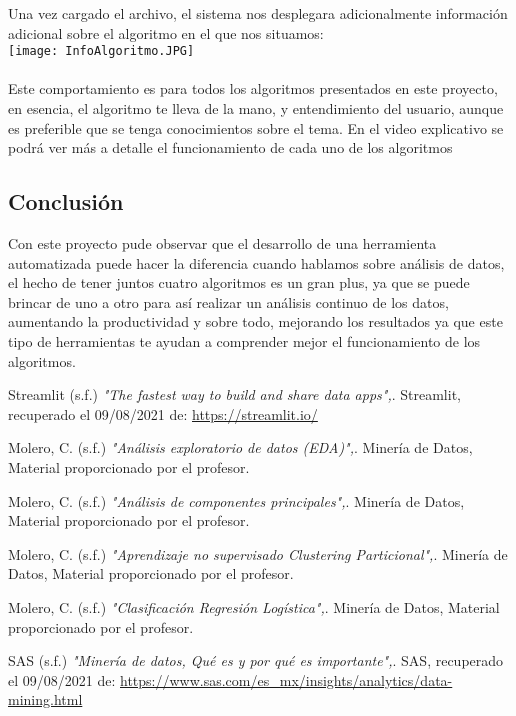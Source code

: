 \documentclass[10pt,a4paper]{article}
\begin{document}
Una vez cargado el archivo, el sistema nos desplegara adicionalmente información adicional sobre el algoritmo en el que nos situamos: \\
\texttt{[image: InfoAlgoritmo.JPG]}
\\ \\
Este comportamiento es para todos los algoritmos presentados en este proyecto, en esencia, el algoritmo te lleva de la mano, y entendimiento del usuario, aunque es preferible que se tenga conocimientos sobre el tema. En el video explicativo se podrá ver más a detalle el funcionamiento de cada uno de los algoritmos


\subsection*{Conclusión}
    Con este proyecto pude observar que el desarrollo de una herramienta automatizada puede hacer la diferencia cuando hablamos sobre análisis de datos, el hecho de tener juntos cuatro algoritmos es un gran plus, ya que se puede brincar de uno a otro para así realizar un análisis continuo de los datos, aumentando la productividad y sobre todo, mejorando los resultados ya que este tipo de herramientas te ayudan a comprender mejor el funcionamiento de los algoritmos.
   

 \begin{thebibliography}{9}
      Streamlit (s.f.) 
     \emph{"The fastest way to build and share data apps",}.
     Streamlit, recuperado el 09/08/2021 de: \url{https://streamlit.io/}
     
     Molero, C. (s.f.) 
     \emph{"Análisis exploratorio de datos
        (EDA)",}.
     Minería de Datos, Material proporcionado por el profesor. 
     
     
     Molero, C. (s.f.) 
     \emph{"Análisis de componentes principales",}.
     Minería de Datos, Material proporcionado por el profesor. 
    
     Molero, C. (s.f.) 
     \emph{"Aprendizaje no supervisado
        Clustering Particional",}.
     Minería de Datos, Material proporcionado por el profesor. 
     
     Molero, C. (s.f.) 
     \emph{"Clasificación Regresión Logística",}.
     Minería de Datos, Material proporcionado por el profesor.
     
      SAS (s.f.) 
     \emph{"Minería de datos, Qué es y por qué es importante",}.
     SAS, recuperado el 09/08/2021 de: \url{https://www.sas.com/es_mx/insights/analytics/data-mining.html}
    
\end{thebibliography}
\end{document}
